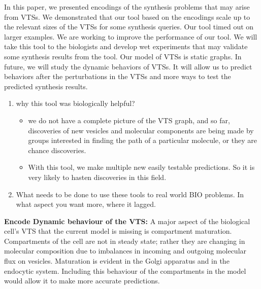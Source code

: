 In this paper, we presented encodings of the synthesis problems
that may arise from VTSs.
%
We demonstrated that our tool based on the encodings
scale up to the relevant sizes of the VTSs for some synthesis queries.
%
Our tool timed out on larger examples.
%
We are working to improve the performance of our tool.
%
We will take this tool to the biologists and develop wet experiments that may validate some synthesis results from the tool.
%
Our model of VTSs is static graphs.
%
In future, we will study the dynamic behaviors of VTSs.
%
It will allow us to predict behaviors after the perturbations in the VTSs
and more ways to test the predicted synthesis results.\\

\begin{enumerate}
  \item why this tool was biologically helpful?
        \begin{itemize}
        	\item we do not have a complete picture of the VTS graph, and so far, discoveries of new vesicles and molecular components are being made by groups interested in finding the path of a particular molecule, or they are chance discoveries. 
        	\item With this tool, we make multiple new easily testable predictions. So it is very likely to hasten discoveries in this field.
        \end{itemize}
  \item What  needs  to  be  done  to  use  these  tools  to  real  world  BIO problems. In what aspect you want more, where it lagged.
\end{enumerate}


\textbf{Encode Dynamic behaviour of the VTS:} A major aspect of the biological cell’s VTS that the current model is missing is compartment maturation. Compartments of the cell are not in steady state; rather they are changing in molecular composition due to imbalances in incoming and outgoing molecular flux on vesicles.
Maturation  is  evident  in  the  Golgi  apparatus  and  in  the  endocytic system. 
Including this behaviour of the compartments in the model would allow it to make more accurate predictions.
